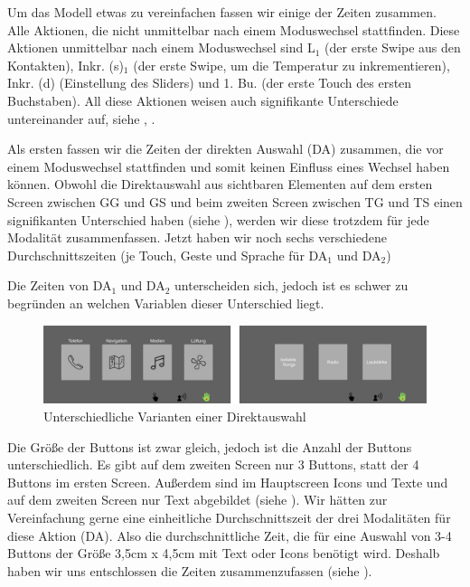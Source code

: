 Um das Modell etwas zu vereinfachen fassen wir einige der Zeiten zusammen. Alle Aktionen, die nicht unmittelbar nach einem Moduswechsel stattfinden. Diese Aktionen unmittelbar nach einem Moduswechsel sind L$_1$ (der erste Swipe aus den Kontakten), Inkr. (s)$_1$ (der erste Swipe, um die Temperatur zu inkrementieren), Inkr. (d) (Einstellung des Sliders) und 1. Bu. (der erste Touch des ersten Buchstaben). All diese Aktionen weisen auch signifikante Unterschiede untereinander auf, siehe , . 

Als ersten fassen wir die Zeiten der direkten Auswahl (DA) zusammen, die vor einem Moduswechsel stattfinden und somit keinen Einfluss eines Wechsel haben können. 
Obwohl die Direktauswahl aus sichtbaren Elementen auf dem ersten Screen zwischen GG und GS und beim zweiten Screen zwischen TG und TS einen signifikanten Unterschied haben (siehe ), werden wir diese trotzdem für jede Modalität zusammenfassen. Jetzt haben wir noch sechs verschiedene Durchschnittszeiten (je Touch, Geste und Sprache für DA$_1$ und DA$_2$)

Die Zeiten von DA$_1$ und DA$_2$ unterscheiden sich, jedoch ist es schwer zu begründen an welchen Variablen dieser Unterschied liegt. 
\begin{figure}
	\centering
		\includegraphics[width=1\textwidth]{img/Screen1vsScreen2.JPG}
	\caption{Unterschiedliche Varianten einer Direktauswahl}
	\label{fig:Screen1vsScreen2}
\end{figure}
Die Größe der Buttons ist zwar gleich, jedoch ist die Anzahl der Buttons unterschiedlich. Es gibt auf dem zweiten Screen nur 3 Buttons, statt der 4 Buttons im ersten Screen. 
Außerdem sind im Hauptscreen Icons und Texte und auf dem zweiten Screen nur Text abgebildet (siehe ). Wir hätten zur Vereinfachung gerne eine einheitliche Durchschnittszeit der drei Modalitäten für diese Aktion (DA). Also die durchschnittliche Zeit, die für eine Auswahl von 3-4 Buttons der Größe 3,5cm x 4,5cm mit Text oder Icons benötigt wird. 
Deshalb haben wir uns entschlossen die Zeiten zusammenzufassen (siehe ).

